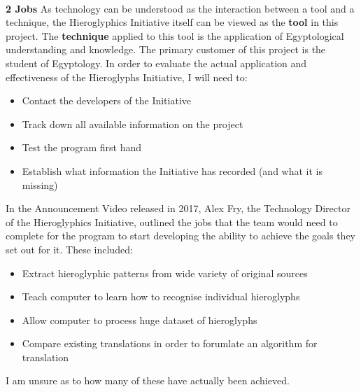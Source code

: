 \documentclass{article}
\begin{document}
\paragraph{} \noindent \break
\textbf{2 Jobs}
\newline \break
As technology can be understood as the interaction between a tool and a technique, the Hieroglyphics Initiative itself can be viewed as the \textbf{tool} in this project. The \textbf{technique} applied to this tool is the application of Egyptological understanding and knowledge. The primary customer of this project is the student of Egyptology.
\newline \noindent \break
In order to evaluate the actual application and effectiveness of the Hieroglyphs Initiative, I will need to:
\newline
\begin{itemize}  
\item Contact the developers of the Initiative
\item Track down all available information on the project
\item Test the program first hand
\item Establish what information the Initiative has recorded (and what it is missing)
\end{itemize}
\noindent \break
In the Announcement Video released in 2017, Alex Fry, the Technology Director of the Hieroglyphics Initiative, outlined the jobs that the team would need to complete for the program to start developing the ability to achieve the goals they set out for it. These included:
\newline
\begin{itemize}  
\item Extract hieroglyphic patterns from wide variety of original sources
\item Teach computer to learn how to recognise individual hieroglyphs
\item Allow computer to process huge dataset of hieroglyphs
\item Compare existing translations in order to forumlate an algorithm for translation
\end{itemize}
\noindent
I am unsure as to how many of these have actually been achieved.
\end{document}
